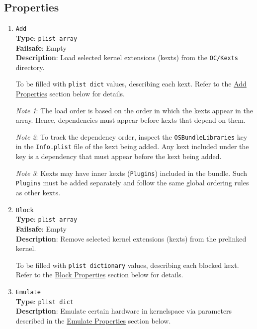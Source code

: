 \documentclass[]{article}
\begin{document}
\subsection{Properties}\label{kernelprops}

\begin{enumerate}

\item
  \texttt{Add}\\
  \textbf{Type}: \texttt{plist\ array}\\
  \textbf{Failsafe}: Empty\\
  \textbf{Description}: Load selected kernel extensions (kexts) from the \texttt{OC/Kexts} directory.

  To be filled with \texttt{plist\ dict} values, describing each kext. Refer to
  the \hyperref[kernelpropsadd]{Add Properties} section below for details.

  \emph{Note 1}: The load order is based on the order in which the kexts appear in
  the array. Hence, dependencies must appear before kexts that depend on them.

  \emph{Note 2}: To track the dependency order, inspect the \texttt{OSBundleLibraries}
  key in the \texttt{Info.plist} file of the kext being added. Any kext included
  under the key is a dependency that must appear before the kext being added.

  \emph{Note 3}: Kexts may have inner kexts (\texttt{Plugins}) included in the bundle.
  Such \texttt{Plugins} must be added separately and follow the same global ordering
  rules as other kexts.

\item
  \texttt{Block}\\
  \textbf{Type}: \texttt{plist\ array}\\
  \textbf{Failsafe}: Empty\\
  \textbf{Description}: Remove selected kernel extensions (kexts) from the prelinked kernel.

  To be filled with \texttt{plist\ dictionary} values, describing each blocked kext.
  Refer to the \hyperref[kernelpropsblock]{Block Properties} section below for details.

\item
  \texttt{Emulate}\\
  \textbf{Type}: \texttt{plist\ dict}\\
  \textbf{Description}: Emulate certain hardware in kernelspace via parameters
  described in the \hyperref[kernelpropsemu]{Emulate Properties} section below.


\end{enumerate}
\end{document}

